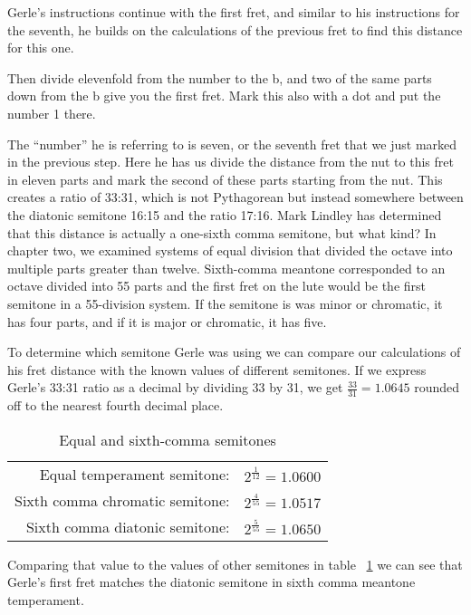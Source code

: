 Gerle's instructions continue with the first fret, and similar to his instructions for the
seventh, he builds on the calculations of the previous fret to find this distance for this
one.
\begin{blocks}
Then divide elevenfold from the number to the b, and two of the same parts down from the b
give you the first fret.  Mark this also with a dot and put the number 1 there.
\end{blocks}
The ``number'' he is referring to is seven, or the seventh fret that we just marked in the
previous step.  Here he has us divide the distance from the nut to this fret in eleven
parts and mark the second of these parts starting from the nut. This creates a ratio of
33:31, which is not Pythagorean but instead somewhere between the diatonic semitone
16:15 and the ratio 17:16. Mark Lindley has determined that this distance is actually a
one-sixth comma semitone, but what kind?  In chapter two, we examined systems of equal
division that divided the octave into multiple parts greater than twelve.  Sixth-comma
meantone corresponded to an octave divided into 55 parts and the first fret on the lute
would be the first semitone in a 55-division system.  If the semitone is was minor or
chromatic, it has four parts, and if it is major or chromatic, it has five.

To determine which semitone Gerle was using we can compare our calculations of his fret
distance with the known values of different semitones.  If we express Gerle's 33:31 ratio
as a decimal by dividing 33 by 31, we get $ \frac{33}{31} = 1.0645 $ rounded off
to the nearest fourth decimal place.
\begin{table}[h!]
    \begin{center}
    \begin{tabular}{ r l }
        Equal temperament semitone:     & $ 2^\frac{1}{12} = 1.0600 $ \\
        Sixth comma chromatic semitone: & $ 2^\frac{4}{55} = 1.0517 $ \\
        Sixth comma diatonic semitone:  & $ 2^\frac{5}{55} = 1.0650 $ \\
    \end{tabular}
    \end{center}
    \caption{Equal and sixth-comma semitones}
    \label{table:6semitones}
\end{table}
Comparing that value to the values of other semitones in table ~\ref{table:6semitones}
we can see that Gerle's first fret matches the diatonic semitone in sixth comma
meantone temperament.

